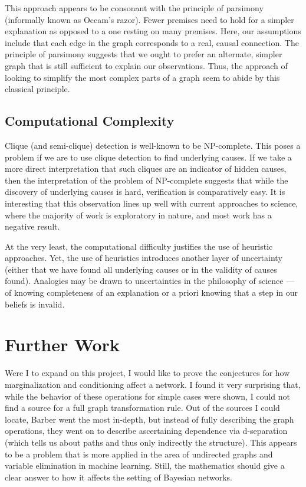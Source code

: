 \documentclass{article}
\begin{document}
	This approach appears to be consonant with the principle of parsimony (informally known as Occam's razor).
	Fewer premises need to hold for a simpler explanation as opposed to a one resting on many premises.
	Here, our assumptions include that each edge in the graph corresponds to a real, causal connection.
	The principle of parsimony suggests that we ought to prefer an alternate, simpler graph that is still sufficient to explain our observations.
	Thus, the approach of looking to simplify the most complex parts of a graph seem to abide by this classical principle.
	
	\subsection{Computational Complexity}
	Clique (and semi-clique) detection is well-known to be NP-complete.
	This poses a problem if we are to use clique detection to find underlying causes.
	If we take a more direct interpretation that such cliques are an indicator of hidden causes, then the interpretation of the problem of NP-complete suggests that while the discovery of underlying causes is hard, verification is comparatively easy.
	It is interesting that this observation lines up well with current approaches to science, where the majority of work is exploratory in nature, and most work has a negative result.
	
	At the very least, the computational difficulty justifies the use of heuristic approaches.
	Yet, the use of heuristics introduces another layer of uncertainty (either that we have found all underlying causes or in the validity of causes found).
	Analogies may be drawn to uncertainties in the philosophy of science --- of knowing completeness of an explanation or a priori knowing that a step in our beliefs is invalid.
	
	\section{Further Work}
	Were I to expand on this project, I would like to prove the conjectures for how marginalization and conditioning affect a network.
	I found it very surprising that, while the behavior of these operations for simple cases were shown, I could not find a source for a full graph transformation rule.
	Out of the sources I could locate, Barber\cite{barberBRML2012} went the most in-depth, but instead of fully describing the graph operations, they went on to describe ascertaining dependence via d-separation (which tells us about paths and thus only indirectly the structure).
	This appears to be a problem that is more applied in the area of undirected graphs and variable elimination in machine learning.
	Still, the mathematics should give a clear answer to how it affects the setting of Bayesian networks.
	
\end{document}
